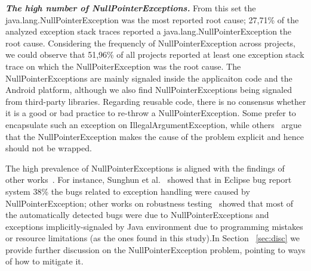 \documentclass[conference]{IEEEtran}
\begin{document}
\emph{\textbf{The high number of NullPointerExceptions.}}
From this set the java.lang.NullPointerException was the most reported root cause; 27,71\% 
of the analyzed exception stack traces reported a java.lang.NullPointerException the root cause. 
Considering the frequencly of NullPointerException across projects, we could observe that
 51,96\% of all projects reported at least one exception stack trace on which the NullPoiterException
was the root cause.
 The NullPointerExceptions are mainly signaled inside the applicaiton code and the Android platform,
 although we also find NullPointerExceptions being signaled from third-party libraries. Regarding
reusable code, there is no consensus whether it is a good or bad practice to 
re-throw a NullPointerException. Some prefer to encapsulate such an exception on
IllegalArgumentException, while others~\cite{bloch2008effective} argue that the
NullPointerException makes the cause of the problem explicit and hence 
should not be wrapped.

The high prevalence of NullPointerExceptions is aligned with the findings of other 
works~\cite{kim2013predicting,fraser20131600,csallner2004jcrasher}. For instance, Sunghun et
al.~\cite{kim2013predicting} showed that in Eclipse bug report system 38\% the bugs 
related to exception handling were caused by NullPointerException; other works on robustness 
testing~\cite{maji2012empirical,csallner2004jcrasher} showed that most of the automatically 
detected bugs were due to NullPointerExceptions 
and exceptions implicitly-signaled by Java environment due to programming mistakes or resource limitations
 (as the ones found in this study).In Section ~\ref{sec:disc}  we provide further 
discussion on the NullPointerException problem, pointing 
to ways of how to mitigate it.

\end{document}
